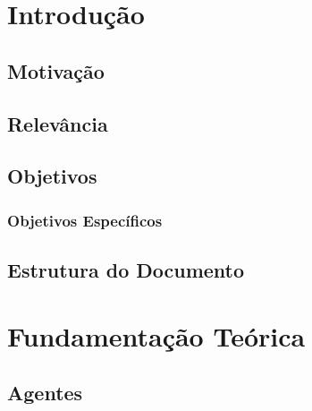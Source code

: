 \documentclass[openright]{normas-utf-tex} %
\begin{document}
\begin{resumo}

\end{resumo}

\begin{abstract}

\end{abstract}

\listadefiguras %
\listadetabelas %

\sumario %

\setcounter{page}{12}
\chapter{Introdução}
	
	\section{Motivação}	\label{motivation}
		
	\section{Relevância} \label{relevance}
		
	\section{Objetivos} \label{goals}
		
		\subsection{Objetivos Específicos}
			
	\section{Estrutura do Documento}
		
\chapter{Fundamentação Teórica}
\label{chap:fundteoric}
	
	\section{Agentes} \label{agent}
		
\end{document}
